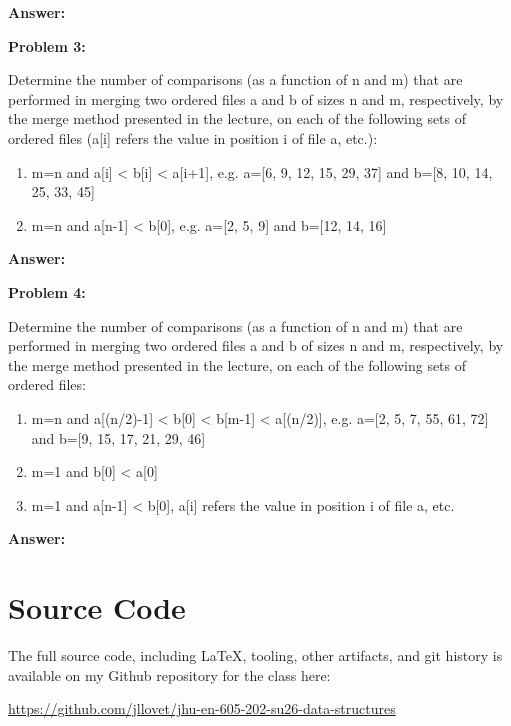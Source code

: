 \documentclass[10pt,letterpaper,final]{report}
\begin{document}
\medskip
\noindent\textbf{Answer:}
\medskip

\noindent\textbf{Problem 3:}
\medskip

Determine the number of comparisons (as a function of n and m) that are performed in merging two ordered files a and b of sizes n and m, respectively, by the merge method presented in the lecture, on each of the following sets of ordered files (a[i] refers the value in position i of file a, etc.):
\begin{enumerate}
  \item m=n and a[i] < b[i] < a[i+1], e.g. a=[6, 9, 12, 15, 29, 37] and b=[8, 10, 14, 25, 33, 45]
  \item m=n and a[n-1] < b[0], e.g. a=[2, 5, 9] and b=[12, 14, 16]
\end{enumerate}

\medskip
\noindent\textbf{Answer:}
\medskip

\noindent\textbf{Problem 4:}
\medskip

Determine the number of comparisons (as a function of n and m) that are performed in merging two ordered files a and b of sizes n and m, respectively, by the merge method presented in the lecture, on each of the following sets of ordered files:
\begin{enumerate}
  \item m=n and a[(n/2)-1] < b[0] < b[m-1] < a[(n/2)], e.g. a=[2, 5, 7,  55, 61, 72] and b=[9, 15, 17, 21, 29, 46]
  \item m=1 and b[0] < a[0]
  \item m=1 and a[n-1] < b[0], a[i] refers the value in position i of file a, etc.
\end{enumerate}

\medskip
\noindent\textbf{Answer:}
\medskip


\pagebreak

\section*{Source Code}
The full source code, including LaTeX, tooling, other artifacts, and git history is available on my Github repository for the class here:
\begin{center}
  \url{https://github.com/jllovet/jhu-en-605-202-su26-data-structures}
\end{center}

\printbibliography
\end{document}
